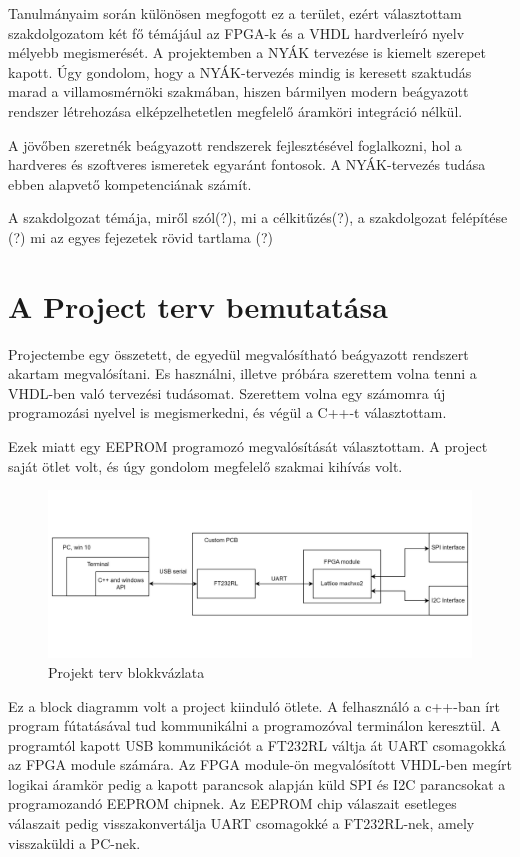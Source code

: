 \documentclass[a4paper,12pt,oneside]{book}
\begin{document}
Tanulmányaim során különösen megfogott ez a terület, ezért választottam szakdolgozatom két fő témájául az FPGA-k és a VHDL hardverleíró nyelv mélyebb megismerését. A projektemben a NYÁK tervezése is kiemelt szerepet kapott. Úgy gondolom, hogy a NYÁK-tervezés mindig is keresett szaktudás marad a villamosmérnöki szakmában, hiszen bármilyen modern beágyazott rendszer létrehozása elképzelhetetlen megfelelő áramköri integráció nélkül. 

A jövőben szeretnék beágyazott rendszerek fejlesztésével foglalkozni, hol a hardveres és szoftveres ismeretek egyaránt fontosok. A NYÁK-tervezés tudása ebben alapvető kompetenciának számít.

A szakdolgozat témája, miről szól(?), mi a célkitűzés(?), a szakdolgozat felépítése (?) mi az egyes fejezetek rövid tartlama (?)
\section{A Project terv bemutatása}
Projectembe egy összetett, de egyedül megvalósítható beágyazott rendszert akartam megvalósítani. Es használni, illetve próbára szerettem volna tenni a VHDL-ben való tervezési tudásomat. Szerettem volna egy számomra új programozási nyelvel is megismerkedni, és végül a C++-t választottam.

Ezek miatt egy EEPROM programozó megvalósítását választottam. A project saját ötlet volt, és úgy gondolom megfelelő szakmai kihívás volt.
\begin{figure}[H]
	\centering
	\includegraphics[trim=1mm 1mm 1mm 1mm,scale=0.245]{terv1.png}
	\caption{Projekt terv blokkvázlata}
	\label{Projekt terv}
\end{figure}
Ez a block diagramm volt a project kiinduló ötlete. A felhasználó a c++-ban írt program fútatásával tud kommunikálni a programozóval terminálon keresztül. A programtól kapott  USB kommunikációt a FT232RL váltja át UART csomagokká az FPGA module számára. Az FPGA module-ön megvalósított VHDL-ben megírt logikai áramkör pedig a kapott parancsok alapján küld SPI és I2C parancsokat a programozandó EEPROM chipnek. Az EEPROM chip válaszait esetleges válaszait pedig visszakonvertálja UART csomagokké a FT232RL-nek, amely visszaküldi a PC-nek.
\end{document}
